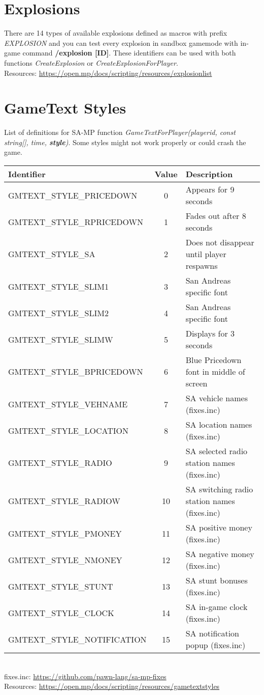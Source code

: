 \documentclass{article}
\begin{document}
\section{Explosions}
There are 14 types of available explosions defined as macros with prefix \textit{EXPLOSION} and you can test every explosion in sandbox gamemode with in-game command \textbf{/explosion [ID]}. These identifiers can be used with both functions \textit{CreateExplosion} or \textit{CreateExplosionForPlayer}.
\bigskip
\\Resources: \url{https://open.mp/docs/scripting/resources/explosionlist}


\newpage
\section{GameText Styles}
\begin{sloppypar}
List of definitions for SA-MP function \textit{GameTextForPlayer(playerid, const string[], time, \textbf{style})}. Some styles might not work properly or could crash the game.
\end{sloppypar}
\bigskip
\noindent\begin{tabular}{ |l|c|l| } 
\hline
Identifier & Value & Description \\
\hline
GMTEXT\_STYLE\_PRICEDOWN & 0 & Appears for 9 seconds \\
GMTEXT\_STYLE\_RPRICEDOWN & 1 & Fades out after 8 seconds \\
GMTEXT\_STYLE\_SA & 2 & Does not disappear until player respawns \\
GMTEXT\_STYLE\_SLIM1 & 3 & San Andreas specific font \\
GMTEXT\_STYLE\_SLIM2 & 4 & San Andreas specific font \\
GMTEXT\_STYLE\_SLIMW & 5 & Displays for 3 seconds \\
GMTEXT\_STYLE\_BPRICEDOWN & 6 & Blue Pricedown font in middle of screen \\
GMTEXT\_STYLE\_VEHNAME & 7 & SA vehicle names (fixes.inc) \\
GMTEXT\_STYLE\_LOCATION & 8 & SA location names (fixes.inc) \\
GMTEXT\_STYLE\_RADIO & 9 & SA selected radio station names (fixes.inc) \\
GMTEXT\_STYLE\_RADIOW & 10 & SA switching radio station names (fixes.inc) \\
GMTEXT\_STYLE\_PMONEY & 11 & SA positive money (fixes.inc) \\
GMTEXT\_STYLE\_NMONEY & 12 & SA negative money (fixes.inc) \\
GMTEXT\_STYLE\_STUNT & 13 & SA stunt bonuses (fixes.inc) \\
GMTEXT\_STYLE\_CLOCK & 14 & SA in-game clock (fixes.inc) \\
GMTEXT\_STYLE\_NOTIFICATION & 15 & SA notification popup (fixes.inc) \\
\hline
\end{tabular}
\bigskip
\\fixes.inc: \url{https://github.com/pawn-lang/sa-mp-fixes}
\bigskip
\\Resources: \url{https://open.mp/docs/scripting/resources/gametextstyles}
\end{document}
